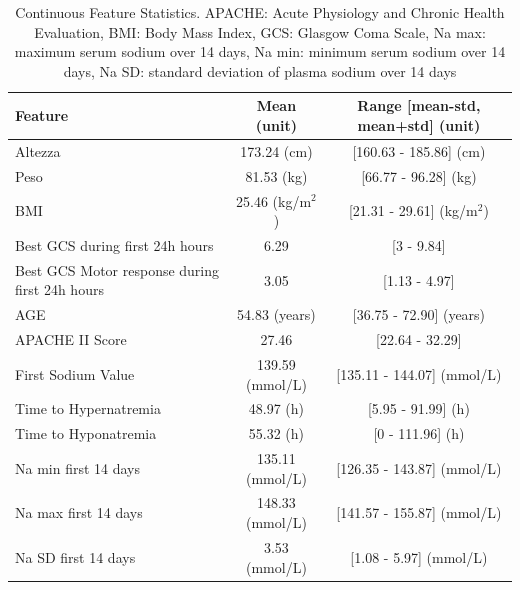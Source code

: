 \begin{table}[h!]
	\centering
	\tiny %
	\begin{tabular}{lcc}
		\hline
		\textbf{Feature} & \textbf{Mean (unit)} & \textbf{{Range} {[mean-std, mean+std]} {(unit)}} \\ \hline
		Altezza & 173.24 (cm) & [160.63 - 185.86] (cm) \\
		Peso & 81.53 (kg) & [66.77 - 96.28] (kg) \\
		BMI & 25.46 (kg/m$^2$) & [21.31 - 29.61] (kg/m$^2$) \\
		Best GCS during first 24h hours & 6.29 & [3 - 9.84] \\
		Best GCS Motor response during first 24h hours & 3.05 & [1.13 - 4.97] \\
		
		AGE  & 54.83 (years) & [36.75 - 72.90] (years) \\
		APACHE II Score & 27.46& [22.64 - 32.29] \\
		First Sodium Value & 139.59 (mmol/L)  & [135.11 - 144.07] (mmol/L) \\
		Time to Hypernatremia & 48.97 (h)  & [5.95 - 91.99] (h) \\
		Time to Hyponatremia & 55.32 (h)  & [0 - 111.96] (h) \\
		Na min first 14 days  & 135.11 (mmol/L)  & [126.35 - 143.87] (mmol/L) \\
		Na max first 14 days  & 148.33 (mmol/L)  & [141.57 - 155.87] (mmol/L) \\
		Na SD first 14 days & 3.53 (mmol/L)  & [1.08 - 5.97] (mmol/L) \\
		\hline
	\end{tabular}
	\caption{Continuous Feature Statistics. \footnotesize{APACHE: Acute Physiology and Chronic Health Evaluation, BMI: Body Mass Index, GCS: Glasgow Coma Scale, Na max: maximum serum sodium over 14 days, Na min: minimum serum sodium over 14 days, Na SD: standard deviation of plasma sodium over 14 days}}
	\label{tab:continuous_features}
\end{table}

